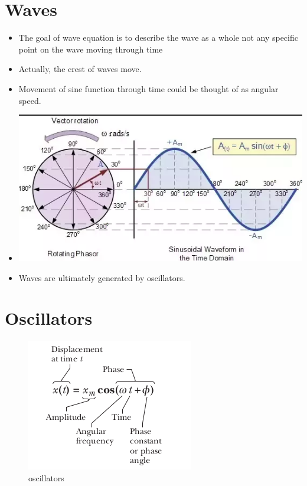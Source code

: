 \documentclass[11pt]{article}
\begin{document}
\hypertarget{waves}{%
\section{Waves}\label{waves}}

\begin{itemize}
\tightlist
\item
  The goal of wave equation is to describe the wave as a whole not any
  specific point on the wave moving through time
\item
  Actually, the crest of waves move.
\item
  Movement of sine function through time could be thought of as angular
  speed.
\item
  \includegraphics{physics/img/sinewave.png}
\item
  Waves are ultimately generated by oscillators.
\end{itemize}

\hypertarget{oscillators}{%
\section{Oscillators}\label{oscillators}}

\begin{figure}
\centering
\includegraphics{img/oscillators.png}
\caption{oscillators}
\end{figure}
\end{document}
